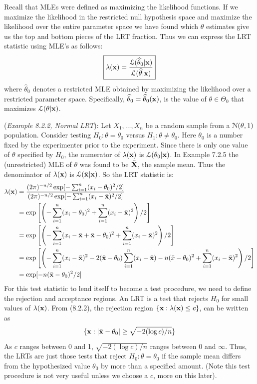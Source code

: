 \documentclass[11pt,]{article}
\def\bx{{\bf x}}
\def\bX{{\bf X}}
\def\thetahat{{\widehat\theta}}
\def\xbar{\bar{ x}}
\def\bxbar{\bar{ \bx}}
\def\bXbar{\bar{ \bX}}
\def\Lsc{{\cal L}}
\def\Nsc{{\cal N}}
\def\sumin{\sum_{i=1}^n}
\def\bxbar{\bar{\bx}}
\begin{document}
Recall that MLEs were defined as maximizing the likelihood functions. If
we maximize the likelihood in the restricted null hypothesis space and
maximize the likelihood over the entire parameter space we have found
which \(\theta\) estimates give us the top and bottom pieces of the LRT
fraction. Thus we can express the LRT statistic using MLE's as follows:
\[\boxed{\lambda(\bx) = \frac{\Lsc(\thetahat_0 | \bx)}{\Lsc(\thetahat | \bx)}}\]
where \(\thetahat_0\) denotes a restricted MLE obtained by maximizing
the likelihood over a restricted parameter space. Specifically,
\(\thetahat_0 = \thetahat_0(\bx)\), is the value of
\(\theta \in \Theta_0\) that maximizes \(\Lsc(\theta| \bx)\).

 (\emph{Example 8.2.2, Normal LRT}): Let
\(X_1, \ldots, X_n\) be a random sample from a \(\Nsc(\theta,1)\)
population. Consider testing \(H_0: \theta = \theta_0\) versus
\(H_1: \theta \neq \theta_0\). Here \(\theta_0\) is a number fixed by
the experimenter prior to the experiment. Since there is only one value
of \(\theta\) specified by \(H_0\), the numerator of \(\lambda(\bx)\) is
\(\Lsc(\theta_0 |\bx)\). In Example 7.2.5 the (unrestricted) MLE of
\(\theta\) was found to be \(\bXbar\), the sample mean. Thus the
denominator of \(\lambda(\bx)\) is \(\Lsc(\bxbar | \bx)\). So the LRT
statistic is: \begin{align*}
\lambda(\bx) &= \frac{(2\pi)^{-n/2}\exp [-\sumin (x_i - \theta_0)^2 /2]}{(2\pi)^{-n/2}\exp [-\sumin (x_i - \bxbar)^2/2]}\\
&= \exp \left[\left( -\sumin (x_i - \theta_0)^2 + \sumin (x_i - \bxbar)^2 \right)/2\right]\\
&= \exp \left[ \left(-\sumin(x_i - \bxbar + \bxbar - \theta_0)^2  + \sumin (x_i - \bxbar)^2  \right)/2\right]\\
&= \exp \left[ \left(-\sumin(x_i - \bxbar)^2 - 2 (\bxbar - \theta_0) \sumin (x_i - \bxbar) - n (\xbar - \theta_0)^2 + \sumin (x_i - \bxbar)^2  \right)/2\right]\\
&= \exp [-n(\bxbar - \theta_0)^2/2]
\end{align*} For this test statistic to lend itself to become a test
procedure, we need to define the rejection and acceptance regions. An
LRT is a test that rejects \(H_0\) for small values of \(\lambda(\bx)\).
From (8.2.2), the rejection region \(\{\bx: \lambda(\bx) \leq c\}\), can
be written as
\[ \{ \bx: | \bxbar - \theta_0 | \geq \sqrt{-2(\log c)/n}\}\] As \(c\)
ranges between 0 and 1, \(\sqrt{-2(\log c)/n}\) ranges between 0 and
\(\infty\). Thus, the LRTs are just those tests that reject
\(H_0: \theta = \theta_0\) if the sample mean differs from the
hypothesized value \(\theta_0\) by more than a specified amount. (Note
this test procedure is not very useful unless we choose a \(c\), more on
this later).
\end{document}

